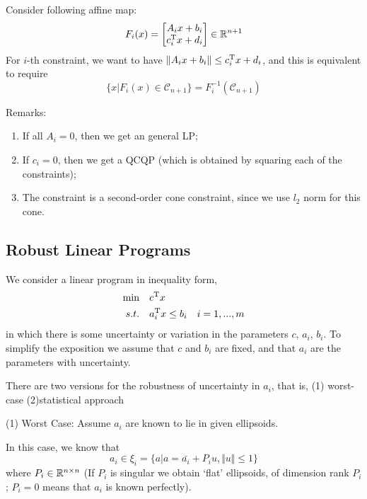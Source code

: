 		
		\begin{example}
		Consider following affine map:
		\begin{equation*}
		F_i(x) = \begin{bmatrix}
		A_ix+b_i\\
		c_i^{{\rm T}}x+d_i
		\end{bmatrix}\in \mathbb{R}^{n+ 1}
		\end{equation*}
		For $i$-th constraint, we want to have $\Vert A_ix+b_i\Vert \leq c^{{\rm T}}_ix+d_i$, and this is equivalent to require
		\begin{equation*}
		\{x\vert F_i(x)\in \mathcal{C}_{n+ 1}\} = F_i^{-1}(\mathcal{C}_{n+ 1})
		\end{equation*}

		Remarks:
		\begin{enumerate}
		\item If all $A_i = 0$, then we get an general LP;
	
		\item If $c_i = 0$, then we get a QCQP (which is obtained by squaring each of the constraints);
	
		\item The constraint is a second-order cone constraint, since we  use $l_2$ norm for this cone.
		\end{enumerate}
		\end{example}



\subsection{Robust Linear Programs}
We consider a linear program in inequality form,
\begin{align*}
\min \quad&c^{{\rm T}}x\\
s.t. \quad&a_i^{{\rm T}}x\leq b_i\quad i = 1,...,m
\end{align*}
in which there is some uncertainty or variation in the parameters $c$, $a_i$, $b_i$. To simplify the exposition we assume that $c$ and $b_i$ are fixed, and that $a_i$ are the parameters with uncertainty.

There are two versions for the robustness of uncertainty in $a_i$, that is, (1) worst-case  (2)statistical approach

\vspace{0.3cm}
(1) Worst Case: Assume $a_i$ are known to lie in given ellipsoids.

In this case, we know that 
$$a_i\in \xi_i = \{a\vert a = \bar{a_i} + P_iu, \Vert u \Vert \leq 1 \} $$
 where $P_i\in\mathbb{R}^{n\times n}$ (If $P_i$ is singular we obtain ‘flat’ ellipsoids, of dimension rank $P_i$;
$P_i = 0$ means that $a_i$ is known perfectly).

